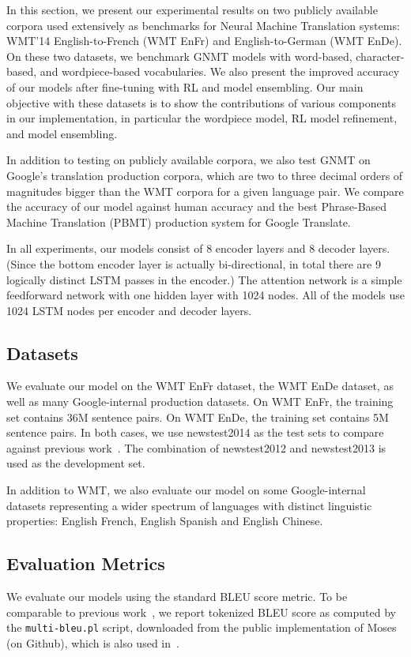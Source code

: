 In this section, we present our experimental results on
two publicly available corpora used extensively as
benchmarks for Neural Machine Translation systems:
WMT'14 English-to-French (WMT EnFr) and
English-to-German (WMT EnDe). On these two datasets, we
benchmark GNMT models with word-based, character-based, and wordpiece-based
vocabularies. We also present the improved accuracy of our models after
fine-tuning with RL and model ensembling. Our main objective
with these datasets is to show the contributions of various components
in our implementation, in particular the wordpiece model, RL
model refinement, and model ensembling.

In addition to testing on publicly available corpora, we also test GNMT on
Google's translation production corpora, which are two to three decimal orders of magnitudes bigger than the WMT corpora for a given language pair. We
compare the accuracy of our model against human accuracy and the 
best Phrase-Based Machine Translation (PBMT) production system for Google Translate.


In all experiments, our models consist of 8 encoder layers and 8 decoder layers.
(Since the bottom encoder layer is actually bi-directional, in total there are
9 logically distinct LSTM passes in the encoder.)
The attention network is a simple feedforward network with one hidden layer with 1024 nodes.
All of the models use 1024 LSTM nodes per encoder and decoder layers.



\subsection{Datasets}
We evaluate our model on the WMT EnFr dataset, the WMT
EnDe dataset, as well as many Google-internal
production datasets. On WMT EnFr, the training set
contains 36M sentence pairs.  On WMT EnDe, the training
set contains 5M sentence pairs. In both cases, we use newstest2014 as the test
sets to compare against previous
work~\cite{luong2015addressing,jean2015using,DBLP:journals/corr/ZhouCWLX16}.
The combination of newstest2012 and newstest2013 is used as the development set.

In addition to WMT, we also evaluate
our model on some Google-internal datasets representing a wider
spectrum of languages with distinct linguistic properties:
English  French, English  Spanish and
English  Chinese.

\subsection{Evaluation Metrics}
We evaluate our models using the standard BLEU score metric. To be
comparable to previous work~\cite{sutskever2014sequence,luong2015addressing,DBLP:journals/corr/ZhouCWLX16}, we report
tokenized BLEU score as computed by the \texttt{multi-bleu.pl} script,
downloaded from the public implementation of Moses (on Github), which is
also used in~\cite{luong2015addressing}.

